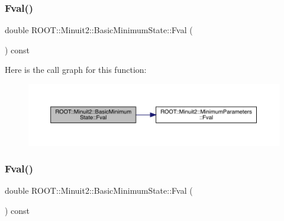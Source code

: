 \subsubsection{\texorpdfstring{Fval()}{Fval()}\hspace{0.1cm}{\footnotesize\ttfamily [2/3]}}
{\footnotesize\ttfamily double R\+O\+O\+T\+::\+Minuit2\+::\+Basic\+Minimum\+State\+::\+Fval (\begin{DoxyParamCaption}{ }\end{DoxyParamCaption}) const\hspace{0.3cm}{\ttfamily [inline]}}

Here is the call graph for this function\+:
\nopagebreak
\begin{figure}[H]
\begin{center}
\leavevmode
\includegraphics[width=350pt]{d0/db1/classROOT_1_1Minuit2_1_1BasicMinimumState_a5151d99e7c6cd7f3b070ad2c62222010_cgraph}
\end{center}
\end{figure}
\mbox{\label{classROOT_1_1Minuit2_1_1BasicMinimumState_a5151d99e7c6cd7f3b070ad2c62222010}} 
\subsubsection{\texorpdfstring{Fval()}{Fval()}\hspace{0.1cm}{\footnotesize\ttfamily [3/3]}}
{\footnotesize\ttfamily double R\+O\+O\+T\+::\+Minuit2\+::\+Basic\+Minimum\+State\+::\+Fval (\begin{DoxyParamCaption}{ }\end{DoxyParamCaption}) const\hspace{0.3cm}{\ttfamily [inline]}}

